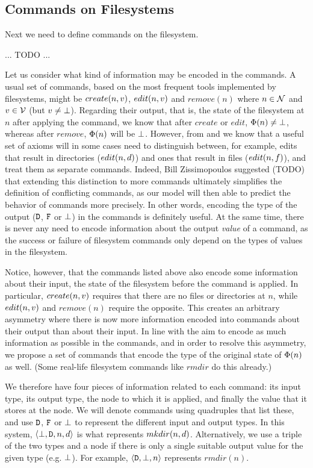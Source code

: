 
\subsection{Commands on Filesystems}

Next we need to define commands on the filesystem.

... TODO ...

Let us consider what kind of information may be encoded in the commands.
A usual set of commands, based on the most frequent tools implemented by filesystems,
might be $create(n,v)$, $edit(n,v)$ and $remove(n)$ 
where $n\in\mathcal{N}$ and $v\in\mathcal{V}$ (but $v\neq\bot$).
Regarding their output, that is, the state of the filesystem at $n$
after applying the command,
we know that after $create$ or $edit$, $\Phi(n)\neq\bot$, whereas after $remove$,
$\Phi(n)$ will be $\bot$. 
However, from \cite{NREC} and \cite{CBNR} we know that a useful set of axioms
will in some cases need to distinguish between, for example,
edits that result in directories ($edit(n,d)$) and
ones that result in files ($edit(n,f)$), and treat them as separate commands.
Indeed, Bill Zissimopoulos suggested (TODO) that extending this distinction to more commands
ultimately simplifies
the definition of conflicting commands, as our model will then able to predict the behavior of commands
more precisely.
In other words, encoding the type of the output ($\mathtt{D}$, $\mathtt{F}$ or $\bot$) in the commands is definitely useful.
At the same time, there is never any need to encode information about the
output \emph{value} of a command,
as the success or failure of filesystem commands only depend on the types of values in the filesystem.

Notice, however, that the commands listed above also encode some information about 
their input, the state of the filesystem
before the command is applied. In particular, $create(n,v)$ requires that there are no files
or directories at $n$, while $edit(n,v)$ and $remove(n)$ require the opposite.
This creates an arbitrary asymmetry where
there is now more information encoded into commands about their output than about their input.
In line with the aim to encode as much information as possible in the commands, %
and in order to resolve this asymmetry, we propose a set of commands that encode
the type of the original state of $\Phi(n)$ as well.
(Some real-life filesystem commands like $rmdir$ do this already.)

We therefore have four pieces of information related to each command:
its input type, its output type, the node to which it is applied, and finally
the value that it stores at the node.
We will denote commands using quadruples that list these,
and use $\mathtt{D}$, $\mathtt{F}$ or $\bot$ to represent the different
input and output types. In this system, $\langle{\bot,\mathtt{D},n,d}\rangle$ 
is what represents $mkdir(n,d)$.
Alternatively, we use a triple of the two types and a node if 
there is only a single suitable output value for the given type (e.g. $\bot$).
For example, $\langle{\mathtt{D},\bot,n}\rangle$ represents $rmdir(n)$.

